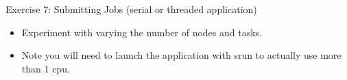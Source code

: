 \documentclass[handout]{beamer} %
\begin{document}
{
%
\begin{frame}{Exercise 7: Submitting Jobs (serial or threaded application)}
\begin{itemize}
\item Experiment with varying the number of nodes and tasks.
\item Note you will need to launch the application with \alert{srun} to actually use more than 1 cpu.
\end{itemize}
\end{frame}
}
\end{document}
